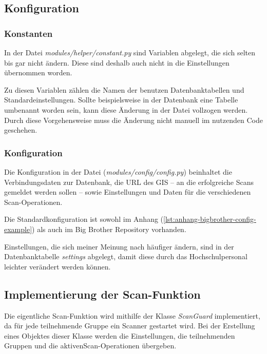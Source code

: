 \subsection{Konfiguration}

\subsubsection{Konstanten}

In der Datei \textit{modules/helper/constant.py} sind Variablen abgelegt, die sich selten bis gar nicht ändern. Diese sind deshalb auch nicht in die Einstellungen übernommen worden.

Zu diesen Variablen zählen die Namen der benutzen Datenbanktabellen und Standardeinstellungen.
Sollte beispielsweise in der Datenbank eine Tabelle umbenannt worden sein, kann diese Änderung in der Datei vollzogen werden. Durch diese Vorgehensweise muss die Änderung nicht manuell im nutzenden Code geschehen.

\subsubsection{Konfiguration}

Die Konfiguration in der Datei (\textit{modules/config/config.py}) beinhaltet die Verbindungsdaten zur Datenbank, die URL des GIS -- an die erfolgreiche Scans gemeldet werden sollen -- sowie Einstellungen und Daten für die verschiedenen Scan-Operationen.

Die Standardkonfiguration ist sowohl im Anhang (\autoref{lst:anhang-bigbrother-config-example}) als auch im Big Brother Repository vorhanden.

Einstellungen, die sich meiner Meinung nach häufiger ändern, sind in der Datenbanktabelle \textit{settings} abgelegt, damit diese durch das Hochschulpersonal leichter verändert werden können.

\subsection{Implementierung der Scan-Funktion}

Die eigentliche Scan-Funktion wird mithilfe der Klasse \textit{ScanGuard} implementiert, da für jede teilnehmende Gruppe ein Scanner gestartet wird. Bei der Erstellung eines Objektes dieser Klasse werden die Einstellungen, die teilnehmenden Gruppen und die aktiven\linebreak Scan-Operationen übergeben.

